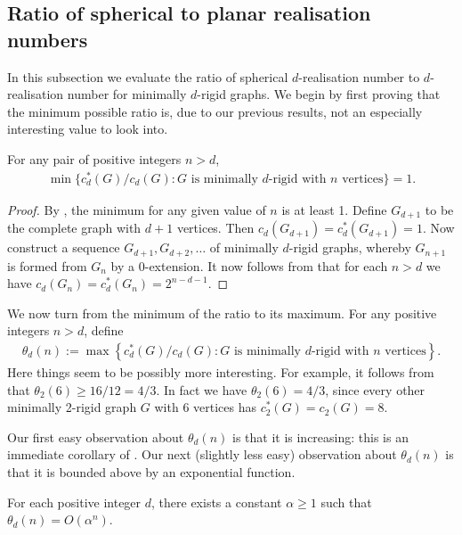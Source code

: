 \documentclass[ALCO]{cedram}
\begin{document}
\subsection{Ratio of spherical to planar realisation numbers}

In this subsection we evaluate the ratio of spherical $d$-realisation number to $d$-realisation number for minimally $d$-rigid graphs.
We begin by first proving that the minimum possible ratio is, due to our previous results, not an especially interesting value to look into.

\begin{proposition}\label{p:asymmin}
	For any pair of positive integers $n > d$,
	\begin{align*}
		\min \{ c^*_d(G) /c_d(G) : G \text{ is minimally $d$-rigid with $n$ vertices} \} = 1.
	\end{align*}
\end{proposition}

\begin{proof}
	By ,
	the minimum for any given value of $n$ is at least 1.
	Define $G_{d+1}$ to be the complete graph with $d+1$ vertices.
	Then $c_d(G_{d+1}) = c^*_d(G_{d+1}) =1$.
	Now construct a sequence $G_{d+1}, G_{d+2},\ldots$ of minimally $d$-rigid graphs,
	whereby $G_{n+1}$ is formed from $G_n$ by a 0-extension.
	It now follows from  that for each $n >d$ we have $c_d(G_{n}) = c^*_d(G_{n}) = 2^{n - d - 1}$.
\end{proof}

We now turn from the minimum of the ratio to its maximum.
For any positive integers $n > d$,
define
\begin{align*}
	\theta_d(n) := \max \left\{ c^*_d(G) /c_d(G) : G \text{ is minimally $d$-rigid with $n$ vertices} \right\}.
\end{align*}
Here things seem to be possibly more interesting.
For example,
it follows from  that $\theta_2(6) \geq 16/12 = 4/3$.
In fact we have $\theta_2(6) = 4/3$,
since every other minimally 2-rigid graph $G$ with 6 vertices has $c_2^*(G)=c_2(G) = 8$.

Our first easy observation about $\theta_d(n)$ is that it is increasing:
this is an immediate corollary of .
Our next (slightly less easy) observation about $\theta_d(n)$ is that it is bounded above by an exponential function.


\begin{proposition}\label{p:asym}
	For each positive integer $d$,
	there exists a constant $\alpha \geq 1$ such that $\theta_d(n) = O(\alpha^n)$.
\end{proposition}
\end{document}
